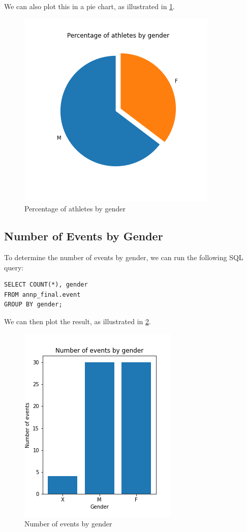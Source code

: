 We can also plot this in a pie chart, as illustrated in \cref{fig:athletesbygender-pie}.

\begin{figure}[H]
    \centering
    \includegraphics[width=.45\textwidth]{img/athletesbygender-pie}
    \caption{Percentage of athletes by gender}
    \label{fig:athletesbygender-pie}
\end{figure}

\subsection{Number of Events by Gender}\label{subsec:number-of-events-by-gender}

To determine the number of events by gender, we can run the following SQL query:

\begin{verbatim}
SELECT COUNT(*), gender
FROM annp_final.event
GROUP BY gender;
\end{verbatim}

We can then plot the result, as illustrated in \cref{fig:eventsbygender}.

\begin{figure}[H]
    \centering
    \includegraphics[width=.35\textwidth]{img/eventsbygender}
    \caption{Number of events by gender}
    \label{fig:eventsbygender}
\end{figure}

